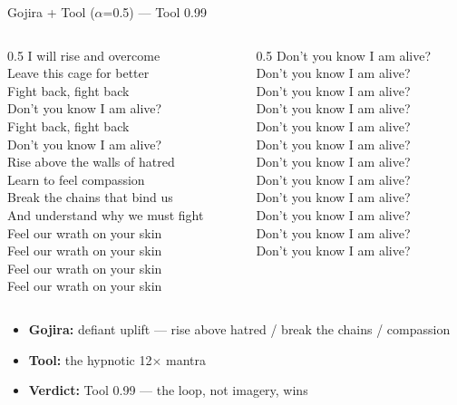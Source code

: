 \documentclass[aspectratio=169]{beamer}
\begin{document}
\begin{frame}{Gojira + Tool ($\alpha$=0.5) --- \textcolor{accent}{Tool 0.99}}
  \scriptsize\itshape\raggedright
  \begin{columns}[T]
    \begin{column}{0.5\textwidth}
      I will rise and overcome\\
      Leave this cage for better\\[4pt]
      Fight back, fight back\\
      Don't you know I am alive?\\
      Fight back, fight back\\
      Don't you know I am alive?\\[4pt]
      Rise above the walls of hatred\\
      Learn to feel compassion\\
      Break the chains that bind us\\
      And understand why we must fight\\[4pt]
      Feel our wrath on your skin\\
      Feel our wrath on your skin\\
      Feel our wrath on your skin\\
      Feel our wrath on your skin
    \end{column}
    \begin{column}{0.5\textwidth}
      Don't you know I am alive?\\
      Don't you know I am alive?\\
      Don't you know I am alive?\\
      Don't you know I am alive?\\
      Don't you know I am alive?\\
      Don't you know I am alive?\\
      Don't you know I am alive?\\
      Don't you know I am alive?\\[4pt]
      Don't you know I am alive?\\
      Don't you know I am alive?\\
      Don't you know I am alive?\\
      Don't you know I am alive?
    \end{column}
  \end{columns}
  \upshape\vskip3pt\footnotesize
  \begin{itemize}\setlength{\itemsep}{1pt}
    \item \textbf{Gojira:} defiant uplift --- rise above hatred / break the chains / compassion
    \item \textbf{Tool:} the hypnotic 12$\times$ mantra
    \item \textcolor{accent}{\textbf{Verdict:} Tool 0.99 --- the loop, not imagery, wins}
  \end{itemize}
\end{frame}
\end{document}
